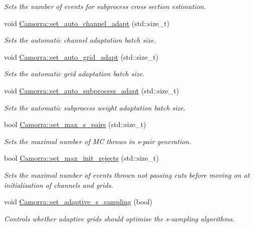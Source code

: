 \begin{DoxyCompactItemize}
\begin{DoxyCompactList}\small\item\em Sets the number of events for subprocess cross section estimation. \end{DoxyCompactList}\item 
void \hyperlink{a00800_a085972c55b81c3f66a21c49159d55bdb}{Camorra::set\_\-auto\_\-channel\_\-adapt} (std::size\_\-t)
\begin{DoxyCompactList}\small\item\em Sets the automatic channel adaptation batch size. \end{DoxyCompactList}\item 
void \hyperlink{a00800_aa604d43264c987f31c73ee58e14515c7}{Camorra::set\_\-auto\_\-grid\_\-adapt} (std::size\_\-t)
\begin{DoxyCompactList}\small\item\em Sets the automatic grid adaptation batch size. \end{DoxyCompactList}\item 
void \hyperlink{a00800_ab141793189f1ee99319706c726ab4baf}{Camorra::set\_\-auto\_\-subprocess\_\-adapt} (std::size\_\-t)
\begin{DoxyCompactList}\small\item\em Sets the automatic subprocess weight adaptation batch size. \end{DoxyCompactList}\item 
bool \hyperlink{a00800_a79b6d2c379b9d68735afe6c7de9b5fc6}{Camorra::set\_\-max\_\-s\_\-pairs} (std::size\_\-t)
\begin{DoxyCompactList}\small\item\em Sets the maximal number of MC throws in s-\/pair generation. \end{DoxyCompactList}\item 
bool \hyperlink{a00800_a2b4a540a4ebed9423bb614d79922b502}{Camorra::set\_\-max\_\-init\_\-rejects} (std::size\_\-t)
\begin{DoxyCompactList}\small\item\em Sets the maximal number of events thrown not passing cuts before moving on at initialisation of channels and grids. \end{DoxyCompactList}\item 
void \hyperlink{a00800_a16e7c2807faba2f7b35546de5cae0c1f}{Camorra::set\_\-adaptive\_\-s\_\-sampling} (bool)
\begin{DoxyCompactList}\small\item\em Controls whether adaptive grids should optimise the s-\/sampling algorithms. \end{DoxyCompactList}\item 

\end{DoxyCompactItemize}
